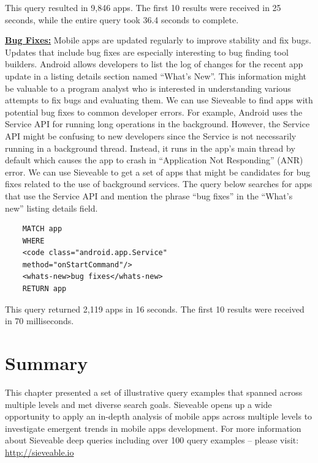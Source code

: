 This query resulted in 9,846 apps. The first 10 results were received in 25 seconds, while the entire query took 36.4 seconds to complete.

\underline{\textbf{{Bug Fixes:}}}
Mobile apps are updated regularly to improve stability and fix bugs.
Updates that include bug fixes are especially interesting to bug finding tool builders.
Android allows developers to list the log of changes for the recent app update in a listing details section named ``What's New''.
This information might be valuable to a program analyst who is interested in understanding various attempts to fix bugs and evaluating them.
We can use Sieveable to find apps with potential bug fixes to common developer errors.
For example, Android uses the Service API for running long operations in the background.
However, the Service API might be confusing to new developers since the Service is not necessarily running in a background thread.
Instead, it runs in the app's main thread by default which causes the app to crash in ``Application Not Responding'' (ANR) error.
We can use Sieveable to get a set of apps that might be candidates for bug fixes related to the use of background services. The query below searches for apps that use the Service API and mention the phrase ``bug fixes'' in the ``What's new'' listing details field.

\begin{verbatim}
	MATCH app
	WHERE
	<code class="android.app.Service"
	method="onStartCommand"/>
	<whats-new>bug fixes</whats-new> 
	RETURN app
\end{verbatim}

This query returned 2,119 apps in 16 seconds. The first 10 results were received in 70 milliseconds.

\section{Summary}
This chapter presented a set of illustrative query examples that spanned across multiple levels and met diverse search goals.
Sieveable opens up a wide opportunity to apply an in-depth analysis of mobile apps across multiple levels to investigate emergent trends in mobile apps development.
For more information about Sieveable deep queries including over 100 query examples -- please visit:
\url{http://sieveable.io}